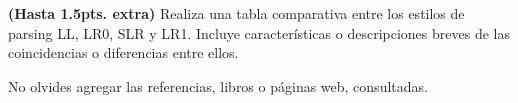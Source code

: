 
\textbf{(Hasta 1.5pts. extra)} Realiza una tabla comparativa entre los estilos
de parsing LL, LR0, SLR y LR1. Incluye caracter\'isticas o descripciones breves
de las coincidencias o diferencias entre ellos. \newline

No olvides agregar las referencias, libros o p\'aginas web, consultadas.
